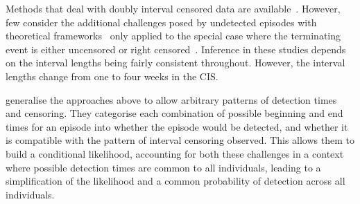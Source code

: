 \documentclass[12pt]{article}
\newcommand\citePersonalComms[1]{(#1, personal communication)}
\begin{document}
Methods that deal with doubly interval censored data are available~\citep{sunStatistical,bogaertsSurvival}.
However, few consider the additional challenges posed by undetected episodes with
theoretical frameworks~\citep{turnbullEmpirical,dempsterMaximum} only applied to the special case where the terminating event is either uncensored or right censored~\citep[e.g.][]{sunEmpirical,bacchettiNonparametric,shenNonparametric}.
Inference in these studies depends on the interval lengths being fairly consistent throughout.
However, the interval lengths change from one to four weeks in the CIS. %

\citet{heiseyModelling} generalise the approaches above to allow arbitrary patterns of detection times and censoring.
They categorise each combination of possible beginning and end times for an episode into whether the episode would be detected, and whether it is compatible with the pattern of interval censoring observed.
This allows them to build a conditional likelihood, accounting for both these challenges in a context where possible detection times are common to all individuals, leading to a simplification of the likelihood and a common probability of detection across all individuals.
\end{document}
